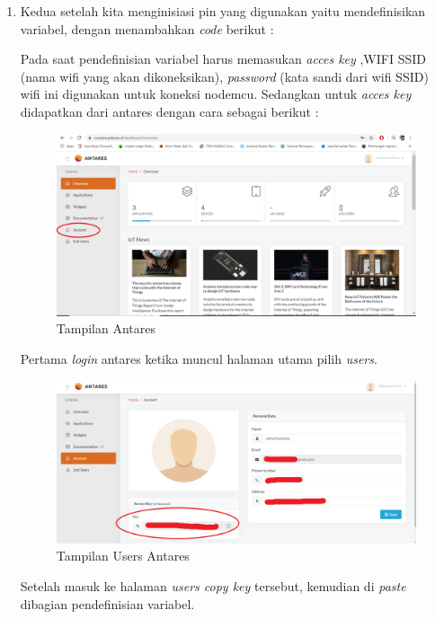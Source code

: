 \begin{enumerate}
\begin{enumerate}
        \item Kedua setelah kita menginisiasi pin yang digunakan yaitu mendefinisikan variabel, dengan menambahkan \textit{code} berikut :
        
        \par Pada saat pendefinisian variabel harus memasukan \textit{acces key} ,WIFI SSID (nama wifi yang akan dikoneksikan), \textit{password} (kata sandi dari wifi SSID) wifi ini digunakan untuk koneksi nodemcu. Sedangkan untuk \textit{acces key} didapatkan dari antares dengan cara sebagai berikut :
         \begin{figure}[H]
        \centering
        \includegraphics[width=1\textwidth]{figures/Key.png}
        \caption{Tampilan Antares}
        \label{print}
        \end{figure}
    \par Pertama \textit{login} antares ketika muncul halaman utama pilih \textit{users}.
     \begin{figure}[H]
    \centering
    \includegraphics[width=1\textwidth]{figures/key2.png}
    \caption{Tampilan Users Antares}
    \label{print}
    \end{figure}
    
    \par Setelah masuk ke halaman \textit{users copy key} tersebut, kemudian di \textit{paste} dibagian pendefinisian variabel.
    

\end{enumerate}
\end{enumerate}
